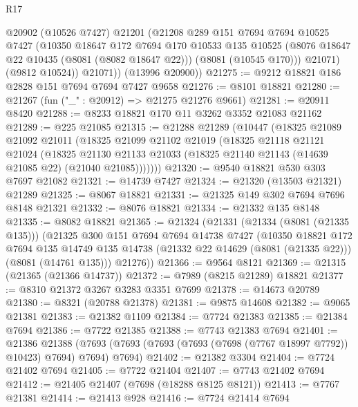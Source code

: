 \begin{lexlean}{R17}
\begin{coremodule}
            @20902
            (@10526 @7427)
            @21201
            (@21208
              @289
              @151
              @7694
              @7694
              @10525
              @7427
              (@10350
                @18647
                @172
                @7694
                @170
                @10533
                @135
                @10525
                (@8076 @18647 @22 @10435 (@8081 (@8082 @18647 @22)))
                (@8081 (@10545 @170)))
              @21071)
            (@9812 @10524))
          @21071))
      (@13996 @20900))
@21275 := @9212 @18821 @186 @2828 @151 @7694 @7694 @7427 @9658
@21276 := @8101 @18821
@21280 := @21267 (fun ("_" : @20912) => @21275 @21276 @9661)
@21281 := @20911 @8420
@21288 := @8233 @18821 @170 @11 @3262 @3352 @21083 @21162
@21289 := @225 @21085
@21315 := @21288
    @21289
    (@10447
      (@18325
        @21089
        @21092
        @21011
        (@18325
          @21099
          @21102
          @21019
          (@18325
            @21118
            @21121
            @21024
            (@18325
              @21130
              @21133
              @21033
              (@18325 @21140 @21143 (@14639 @21085 @22) (@21040 @21085)))))))
@21320 := @9540 @18821 @530 @303 @7697 @21082
@21321 := @14739 @7427
@21324 := @21320 (@13503 @21321) @21289
@21325 := @8067 @18821
@21331 := @21325 @149 @302 @7694 @7696 @8148 @21321
@21332 := @8076 @18821
@21334 := @21332 @135 @8148
@21335 := @8082 @18821
@21365 := @21324
    (@21331
      (@21334 (@8081 (@21335 @135)))
      (@21325
        @300
        @151
        @7694
        @7694
        @14738
        @7427
        (@10350
          @18821
          @172
          @7694
          @135
          @14749
          @135
          @14738
          (@21332 @22 @14629 (@8081 (@21335 @22)))
          (@8081 (@14761 @135)))
        @21276))
@21366 := @9564 @8121
@21369 := @21315 (@21365 (@21366 @14737))
@21372 := @7989 (@8215 @21289) @18821
@21377 := @8310 @21372 @3267 @3283 @3351 @7699
@21378 := @14673 @20789
@21380 := @8321 (@20788 @21378)
@21381 := @9875 @14608
@21382 := @9065 @21381
@21383 := @21382 @1109
@21384 := @7724 @21383
@21385 := @21384 @7694
@21386 := @7722 @21385
@21388 := @7743 @21383 @7694
@21401 := @21386
    @21388
    (@7693 (@7693 (@7693 (@7693 (@7698 (@7767 @18997 @7792)) @10423) @7694) @7694) @7694)
@21402 := @21382 @3304
@21404 := @7724 @21402 @7694
@21405 := @7722 @21404
@21407 := @7743 @21402 @7694
@21412 := @21405 @21407 (@7698 (@18288 @8125 @8121))
@21413 := @7767 @21381
@21414 := @21413 @928
@21416 := @7724 @21414 @7694

\end{coremodule}
\end{lexlean}

